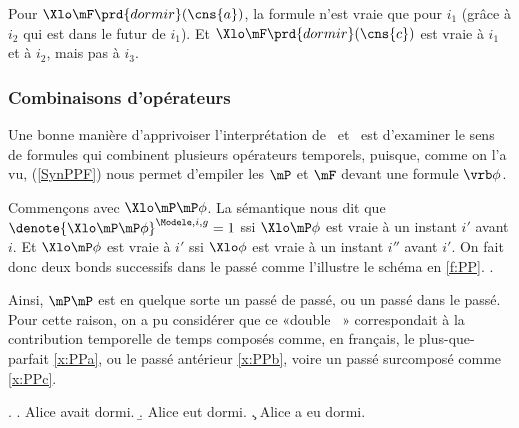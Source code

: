 \fussy

Pour \(\Xlo\mF\prd{dormir}(\cns{a})\), la formule n'est vraie que pour
$i_1$ (grâce à $i_2$ qui est dans le futur de $i_1$). Et \(\Xlo\mF\prd{dormir}(\cns{c})\) est vraie à $i_1$ et à $i_2$, mais pas à $i_3$.



\smallskip






\subsubsection{Combinaisons d'opérateurs}

Une bonne manière d'apprivoiser l'interprétation de \mP\ et \mF\ est d'examiner le sens de formules qui combinent plusieurs opérateurs temporels, puisque, comme on l'a vu, (\RSyn\ref{SynPPF}) nous permet d'empiler 
 les $\mP$ et $\mF$ devant une formule
$\vrb\phi$.

Commençons avec $\Xlo\mP\mP\phi$. La sémantique nous dit que 
% 
\(\denote{\Xlo\mP\mP\phi}^{\Modele,i,g}=1\) ssi $\Xlo\mP\phi$ est vraie
à un instant $i'$ avant $i$. Et $\Xlo\mP\phi$ est vraie à $i'$ ssi $\Xlo\phi$ est vraie à un instant $i''$ avant $i'$.  On fait donc deux bonds successifs dans le passé comme l'illustre le schéma en  \ref{f:PP}.
\ex. 
\label{f:PP}

Ainsi, $\mP\mP$ est en quelque sorte un passé de passé, ou un passé dans le passé.  
Pour cette raison, on a pu considérer que ce «double \mP~» correspondait à la contribution temporelle de temps composés comme, en français, le plus-que-parfait \ref{x:PPa}, ou  le passé antérieur \ref{x:PPb}, voire 
un passé 
surcomposé comme \ref{x:PPc}. 


\ex.
\a. Alice avait dormi.\label{x:PPa}
\b. Alice eut dormi.\label{x:PPb}
\c. Alice a eu dormi.\label{x:PPc}


%



